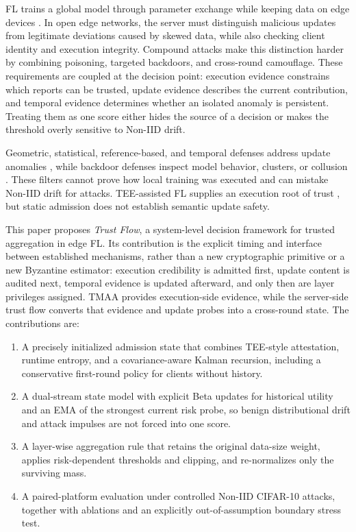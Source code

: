 \documentclass[conference,compsoc]{IEEEtran}
\newenvironment{tightenumerate}{%
    \begin{enumerate}\setlength{\itemsep}{1pt}\setlength{\parskip}{0pt}\setlength{\parsep}{0pt}}{\end{enumerate}}
\begin{document}
FL trains a global model through parameter exchange while keeping data on edge devices \cite{kairouz2021flsurvey,mcmahan2017fedavg}. In open edge networks, the server must distinguish malicious updates from legitimate deviations caused by skewed data, while also checking client identity and execution integrity. Compound attacks make this distinction harder by combining poisoning, targeted backdoors, and cross-round camouflage. These requirements are coupled at the decision point: execution evidence constrains which reports can be trusted, update evidence describes the current contribution, and temporal evidence determines whether an isolated anomaly is persistent. Treating them as one score either hides the source of a decision or makes the threshold overly sensitive to Non-IID drift.

Geometric, statistical, reference-based, and temporal defenses address update anomalies \cite{blanchard2017krum,yin2018byzantine,cao2021fltrust,fung2020foolsgold,fldetector2022}, while backdoor defenses inspect model behavior, clusters, or collusion \cite{deepsight2022,flame2022,crowdguard2024,roseagg}. These filters cannot prove how local training was executed and can mistake Non-IID drift for attacks. TEE-assisted FL supplies an execution root of trust \cite{r1_tee_integrity,xu2021distributed,r5_tee_mitigating,lu2025tmt}, but static admission does not establish semantic update safety.

This paper proposes \emph{Trust Flow}, a system-level decision framework for trusted aggregation in edge FL. Its contribution is the explicit timing and interface between established mechanisms, rather than a new cryptographic primitive or a new Byzantine estimator: execution credibility is admitted first, update content is audited next, temporal evidence is updated afterward, and only then are layer privileges assigned. TMAA provides execution-side evidence, while the server-side trust flow converts that evidence and update probes into a cross-round state. The contributions are:
\begin{tightenumerate}
    \item A precisely initialized admission state that combines TEE-style attestation, runtime entropy, and a covariance-aware Kalman recursion, including a conservative first-round policy for clients without history.
    \item A dual-stream state model with explicit Beta updates for historical utility and an EMA of the strongest current risk probe, so benign distributional drift and attack impulses are not forced into one score.
    \item A layer-wise aggregation rule that retains the original data-size weight, applies risk-dependent thresholds and clipping, and re-normalizes only the surviving mass.
    \item A paired-platform evaluation under controlled Non-IID CIFAR-10 attacks, together with ablations and an explicitly out-of-assumption boundary stress test.
\end{tightenumerate}
\end{document}
